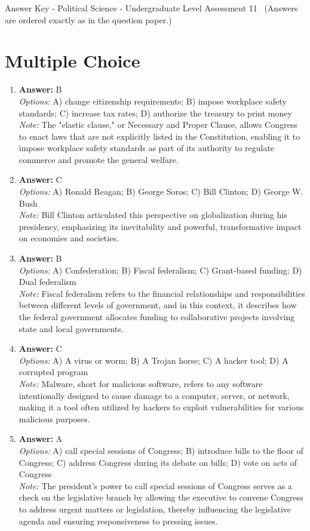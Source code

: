 \documentclass[12pt]{article}
\begin{document}
\begin{center}
Answer Key - Political Science - Undergraduate Level Assessment 11 \
\small (Answers are ordered exactly as in the question paper.)
\end{center}

\section*{Multiple Choice}
\begin{enumerate}[label=\arabic*.]
\item \textbf{Answer:} B
\\ \textit{Options:} A) change citizenship requirements; B) impose workplace safety standards; C) increase tax rates; D) authorize the treasury to print money
\\ \textit{Note:} The "elastic clause," or Necessary and Proper Clause, allows Congress to enact laws that are not explicitly listed in the Constitution, enabling it to impose workplace safety standards as part of its authority to regulate commerce and promote the general welfare.
\item \textbf{Answer:} C
\\ \textit{Options:} A) Ronald Reagan; B) George Soros; C) Bill Clinton; D) George W. Bush
\\ \textit{Note:} Bill Clinton articulated this perspective on globalization during his presidency, emphasizing its inevitability and powerful, transformative impact on economies and societies.
\item \textbf{Answer:} B
\\ \textit{Options:} A) Confederation; B) Fiscal federalism; C) Grant-based funding; D) Dual federalism
\\ \textit{Note:} Fiscal federalism refers to the financial relationships and responsibilities between different levels of government, and in this context, it describes how the federal government allocates funding to collaborative projects involving state and local governments.
\item \textbf{Answer:} C
\\ \textit{Options:} A) A virus or worm; B) A Trojan horse; C) A hacker tool; D) A corrupted program
\\ \textit{Note:} Malware, short for malicious software, refers to any software intentionally designed to cause damage to a computer, server, or network, making it a tool often utilized by hackers to exploit vulnerabilities for various malicious purposes.
\item \textbf{Answer:} A
\\ \textit{Options:} A) call special sessions of Congress; B) introduce bills to the floor of Congress; C) address Congress during its debate on bills; D) vote on acts of Congress
\\ \textit{Note:} The president's power to call special sessions of Congress serves as a check on the legislative branch by allowing the executive to convene Congress to address urgent matters or legislation, thereby influencing the legislative agenda and ensuring responsiveness to pressing issues.
\end{enumerate}
\end{document}
